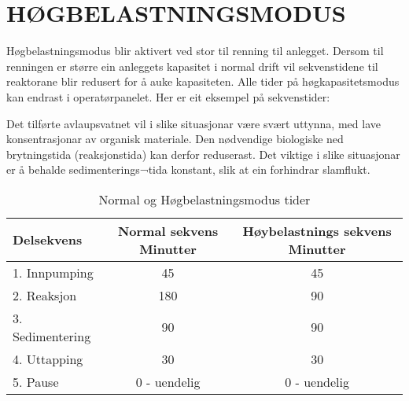 \newpage
\section{HØGBELASTNINGSMODUS}

Høgbelastningsmodus blir aktivert ved stor til renning til anlegget. 
Dersom til renningen er større ein anleggets kapasitet i normal drift vil sekvenstidene til reaktorane blir redusert for å auke kapasiteten. 
Alle tider på høgkapasitetsmodus kan endrast i operatørpanelet.
Her er eit eksempel på sekvenstider:

Det tilførte avlaupsvatnet vil i slike situasjonar være svært uttynna, med lave konsentrasjonar av organisk materiale.
Den nødvendige biologiske ned brytningstida (reaksjonstida) kan derfor reduserast. 
Det viktige i slike situasjonar er å behalde sedimenterings¬tida konstant, slik at ein forhindrar slamflukt.

\begin{table}[h]
    \centering
    \begin{tabular}{|l|c|c|}
    \hline
    \rowcolor{myblack} %
    \textcolor{purewhite}{Delsekvens} & \textcolor{purewhite}{Normal sekvens Minutter} & \textcolor{purewhite}{Høybelastnings sekvens Minutter} \\ \hline
    \rowcolor{lightgray} 1. Innpumping & 45 & 45 \\ \hline
    \rowcolor{purewhite} 2. Reaksjon & 180 & 90 \\ \hline 
    \rowcolor{lightgray} 3. Sedimentering & 90 & 90 \\ \hline
    \rowcolor{purewhite} 4. Uttapping & 30 & 30 \\ \hline
    \rowcolor{lightgray} 5. Pause & 0 - uendelig & 0 - uendelig  \\ \hline
    \end{tabular}
    \caption{Normal og Høgbelastningsmodus tider}\label{table:Normal Og Høgbelastningsmodus}
\end{table}